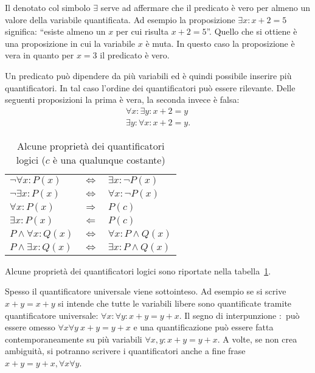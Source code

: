 Il  denotato col simbolo
$\exists$ serve ad affermare che il predicato è vero per
almeno un valore della variabile quantificata.
Ad esempio la proposizione $\exists x\colon x+2=5$ significa:
``esiste almeno un $x$ per cui risulta $x+2=5$''.
Quello che si ottiene è una proposizione in cui la variabile
$x$ è muta. In questo caso la proposizione è vera in quanto
per $x=3$ il predicato è vero.

Un predicato può dipendere da più variabili ed è quindi
possibile inserire più quantificatori. In tal caso l'ordine
dei quantificatori può essere rilevante.
Delle seguenti proposizioni la prima è vera, la seconda
invece è falsa:
\begin{gather*}
\forall x\colon \exists y\colon x+2=y \\
\exists y\colon \forall x\colon x+2=y.
\end{gather*}

\begin{table}
\begin{center}
\begin{tabular}{lcl}
$\lnot \forall x \colon P(x)$ & $\iff$ & $\exists x \colon \lnot P(x)$\\
$\lnot \exists x \colon P(x)$ & $\iff$ & $\forall x \colon \lnot P(x)$\\
$\forall x \colon P(x)$ & $\Longrightarrow$ & $P(c)$\\
$\exists x \colon P(x)$ & $\Longleftarrow$ & $P(c)$\\
$P \land \forall x \colon Q(x)$ & $\iff$ & $\forall x\colon P\land Q(x)$\\
$P \land \exists x \colon Q(x)$ & $\iff$ & $\exists x \colon P \land Q(x)$
\end{tabular}
\end{center}
\caption{Alcune proprietà dei quantificatori logici ($c$ è una qualunque costante)}
\label{tab:proprieta_quantificatori}
\end{table}

Alcune proprietà dei quantificatori logici sono riportate
nella tabella~\ref{tab:proprieta_quantificatori}.

Spesso il quantificatore universale viene sottointeso.
Ad esempio se si scrive $x+y=x+y$
si intende che tutte le variabili libere sono quantificate 
tramite quantificatore universale: 
$\forall x\colon \forall y\colon x+y=y+x$.
Il segno di interpunzione $\colon$ può essere omesso
$\forall x \forall y\ x+y=y+x$
e una quantificazione può essere fatta contemporaneamente 
su più variabili $\forall x,y\colon x+y = y+x$.
A volte, se non crea ambiguità, si potranno scrivere 
i quantificatori anche a fine frase $x+y=y+x, \forall x\forall y$.

